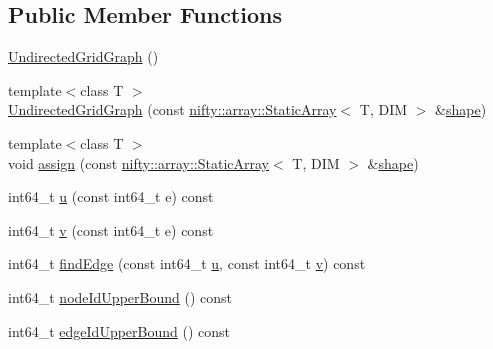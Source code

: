 \subsection*{Public Member Functions}
\begin{DoxyCompactItemize}
\item 
\hyperlink{classnifty_1_1graph_1_1UndirectedGridGraph_3_01DIM_00_01true_01_4_ae07e559f9d33b543c69a6466bbc10348}{Undirected\+Grid\+Graph} ()
\item 
{\footnotesize template$<$class T $>$ }\\\hyperlink{classnifty_1_1graph_1_1UndirectedGridGraph_3_01DIM_00_01true_01_4_a6776a2c7c54036eb5c4df8045c6a7d44}{Undirected\+Grid\+Graph} (const \hyperlink{namespacenifty_1_1array_a683f151f19c851754e0c6d55ed16a0c2}{nifty\+::array\+::\+Static\+Array}$<$ T, D\+IM $>$ \&\hyperlink{classnifty_1_1graph_1_1UndirectedGridGraph_3_01DIM_00_01true_01_4_a206b74a50e85536e1adcb973a462b948}{shape})
\item 
{\footnotesize template$<$class T $>$ }\\void \hyperlink{classnifty_1_1graph_1_1UndirectedGridGraph_3_01DIM_00_01true_01_4_ad966a5e524bba56b8096c999d41bfeae}{assign} (const \hyperlink{namespacenifty_1_1array_a683f151f19c851754e0c6d55ed16a0c2}{nifty\+::array\+::\+Static\+Array}$<$ T, D\+IM $>$ \&\hyperlink{classnifty_1_1graph_1_1UndirectedGridGraph_3_01DIM_00_01true_01_4_a206b74a50e85536e1adcb973a462b948}{shape})
\item 
int64\+\_\+t \hyperlink{classnifty_1_1graph_1_1UndirectedGridGraph_3_01DIM_00_01true_01_4_a061e5fc87fa6db797c9dce8aa7f49693}{u} (const int64\+\_\+t e) const
\item 
int64\+\_\+t \hyperlink{classnifty_1_1graph_1_1UndirectedGridGraph_3_01DIM_00_01true_01_4_a931c1a92fb28eab2e47e7abb5a2cd941}{v} (const int64\+\_\+t e) const
\item 
int64\+\_\+t \hyperlink{classnifty_1_1graph_1_1UndirectedGridGraph_3_01DIM_00_01true_01_4_a91ed1b6c9e79f2fa44d451675e832aee}{find\+Edge} (const int64\+\_\+t \hyperlink{classnifty_1_1graph_1_1UndirectedGridGraph_3_01DIM_00_01true_01_4_a061e5fc87fa6db797c9dce8aa7f49693}{u}, const int64\+\_\+t \hyperlink{classnifty_1_1graph_1_1UndirectedGridGraph_3_01DIM_00_01true_01_4_a931c1a92fb28eab2e47e7abb5a2cd941}{v}) const
\item 
int64\+\_\+t \hyperlink{classnifty_1_1graph_1_1UndirectedGridGraph_3_01DIM_00_01true_01_4_a97394903dbcf9f0f673a66d0a70df5ff}{node\+Id\+Upper\+Bound} () const
\item 
int64\+\_\+t \hyperlink{classnifty_1_1graph_1_1UndirectedGridGraph_3_01DIM_00_01true_01_4_ad632562621035fd08b7a69c7da651f5d}{edge\+Id\+Upper\+Bound} () const

\end{DoxyCompactItemize}
